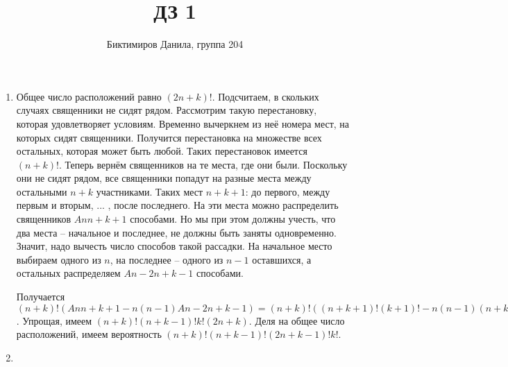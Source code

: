 \documentclass[11pt]{article}
\begin{document}
	
	\author{Биктимиров Данила, группа 204}
	\title{ДЗ 1}
	\date{}
	\maketitle
	
	\medskip
	
	\begin{enumerate}
		
		\item
			Общее число расположений равно $(2n+k)!$. Подсчитаем, в скольких случаях священники не сидят рядом. Рассмотрим такую перестановку, которая удовлетворяет условиям. Временно вычеркнем из неё номера мест, на которых сидят священники. Получится перестановка на множестве всех остальных, которая может быть любой. Таких перестановок имеется $(n+k)!$. Теперь вернём священников на те места, где они были. Поскольку они не сидят рядом, все священники попадут на разные места между остальными $n+k$ участниками. Таких мест $n+k+1$: до первого, между первым и вторым, $...$ , после последнего. На эти места можно распределить священников $Ann+k+1$ способами. Но мы при этом должны учесть, что два места -- начальное и последнее, не должны быть заняты одновременно. Значит, надо вычесть число способов такой рассадки. На начальное место выбираем одного из $n$, на последнее -- одного из $n−1$ оставшихся, а остальных распределяем $An−2n+k−1$ способами.
			
			Получается $(n+k)!(Ann+k+1−n(n−1)An−2n+k−1)=(n+k)!((n+k+1)!(k+1)!−n(n−1)(n+k−1)!(k+1)!)$. Упрощая, имеем $(n+k)!(n+k−1)!k!(2n+k)$. Деля на общее число расположений, имеем вероятность $(n+k)!(n+k−1)!(2n+k−1)!k!$.
		\item
		
		
	\end{enumerate}
\end{document}
